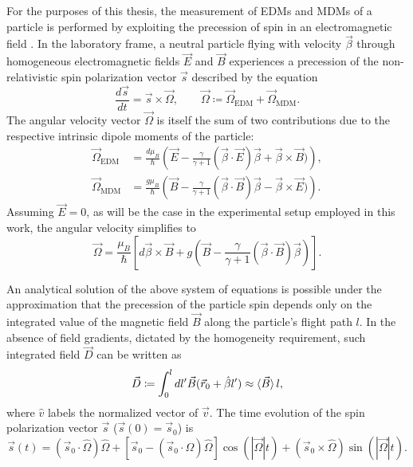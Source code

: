For the purposes of this thesis, the measurement of EDMs and MDMs of a particle is performed by exploiting the precession of spin in an electromagnetic field \cite{EMDipoleSearch}.
In the laboratory frame, a neutral particle flying with velocity $\vec{\beta}$ through homogeneous electromagnetic fields $\vec{E}$ and $\vec{B}$ experiences a precession of the non-relativistic spin polarization vector $\vec{s}$ described by the equation
\begin{equation}
\frac{d\vec{s}}{dt} = \vec{s} \times \vec{\Omega},
\quad\quad
\vec{\Omega} \coloneqq \vec{\Omega}_\text{EDM} + \vec{\Omega}_\text{MDM}.
\end{equation}
The angular velocity vector $\vec{\Omega}$ is itself the sum of two contributions due to the respective intrinsic dipole moments of the particle:
\begin{align}
\vec{\Omega}_\text{EDM} &= \frac{d\mu_B}{\hbar}
\left(
\vec{E} - \frac{\gamma}{\gamma+1} (\vec{\beta} \cdot \vec{E})\vec{\beta} + \vec{\beta} \times \vec{B})
\right), \\
\vec{\Omega}_\text{MDM} &= \frac{g\mu_B}{\hbar}
\left(
\vec{B} - \frac{\gamma}{\gamma+1} (\vec{\beta} \cdot \vec{B})\vec{\beta} - \vec{\beta} \times \vec{E})
\right).
\end{align}
Assuming $\vec{E} = 0$, as will be the case in the experimental setup employed in this work, the angular velocity simplifies to
\begin{equation}
\vec{\Omega} = \frac{\mu_B}{\hbar}
\left[
	d\vec{\beta} \times \vec{B}
	+
	g\left(
	\vec{B} - \frac{\gamma}{\gamma+1}(\vec{\beta} \cdot \vec{B}) \vec{\beta}
	\right)
\right].
\label{eq:system_spin_precession}
\end{equation}

An analytical solution of the above system of equations is possible under the approximation that the precession of the particle spin depends only on the integrated value of the magnetic field $\vec{B}$ along the particle's flight path $l$.
In the absence of field gradients, dictated by the homogeneity requirement, such integrated field $\vec{D}$ can be written as
\begin{equation}
	\vec{D} \coloneqq \int_0^l dl' \vec{B}(\vec{r}_0 +\hat{\beta} l') \approx \braket{\vec{B}} l,
	\label{eq:integratedD}
\end{equation}
where $\hat{v}$ labels the normalized vector of $\vec{v}$.
The time evolution of the spin polarization vector $\vec{s}$ ($\vec{s}(0) = \vec{s}_0$) is
\begin{equation}
	\vec{s} \left(
		t
	\right) =
	\left(
		\vec{s}_0 \cdot \hat{\Omega}
	\right) \hat{\Omega}
	+
	\left[
		\vec{s}_0 - \left(
			\vec{s}_0 \cdot \hat{\Omega}
		\right) \hat{\Omega}
	\right]
	\cos \left(
		\left \lvert
			\vec{\Omega}
		\right\rvert t
	\right)
	+
	\left(
		\vec{s}_0 \times \hat{\Omega}
	\right)
	\sin \left(
		\left \lvert
			\vec{\Omega}
		\right\rvert t
	\right).
\label{eq:spin-precession-t_cap1}
\end{equation}

